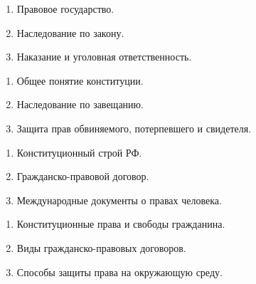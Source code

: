 \newpage


\shapkFull
\setcounter{zad}{0}

\begin{enumerate}
	\item Правовое государство.

	\item Наследование по закону.

	\item Наказание и уголовная ответственность.

\end{enumerate}

\newpage


\shapkFull
\setcounter{zad}{0}

\begin{enumerate}
	\item Общее понятие конституции.

	\item Наследование по завещанию.

	\item Защита прав обвиняемого, потерпевшего и свидетеля.

\end{enumerate}

\newpage


\shapkFull
\setcounter{zad}{0}

\begin{enumerate}
	\item Конституционный строй РФ.

	\item Гражданско-правовой договор.

	\item Международные документы о правах человека.

\end{enumerate}

\newpage


\shapkFull
\setcounter{zad}{0}

\begin{enumerate}
	\item Конституционные права и свободы гражданина.

	\item Виды гражданско-правовых договоров.

	\item Способы защиты права на окружающую среду.

\end{enumerate}

